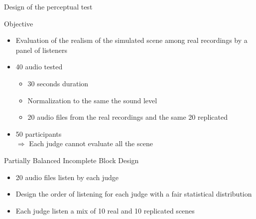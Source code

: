 \documentclass{beamer}
\begin{document}
\begin{frame}{Design of the perceptual test}

\begin{block}{Objective}
\begin{itemize}
	\item Evaluation of the realism of the simulated scene among real recordings by a panel of listeners
\end{itemize}
\end{block}

\begin{itemize}
	\item 40 audio tested
	\begin{itemize}
		\item 30 seconds duration
		\item Normalization to the same the sound level
		\item 20 audio files from the real recordings and the same 20 replicated
	\end{itemize}

	\item 50 participants \\
	$\Rightarrow$ Each judge cannot evaluate all the scene
\end{itemize}

\begin{block}{Partially Balanced Incomplete Block Design}
\begin{itemize}
	\item 20 audio files listen by each judge
	\item Design the order of listening for each judge with a fair statistical distribution
	\item Each judge listen a mix of 10 real and 10 replicated scenes
\end{itemize}

\end{block}

\end{frame}

\end{document}
